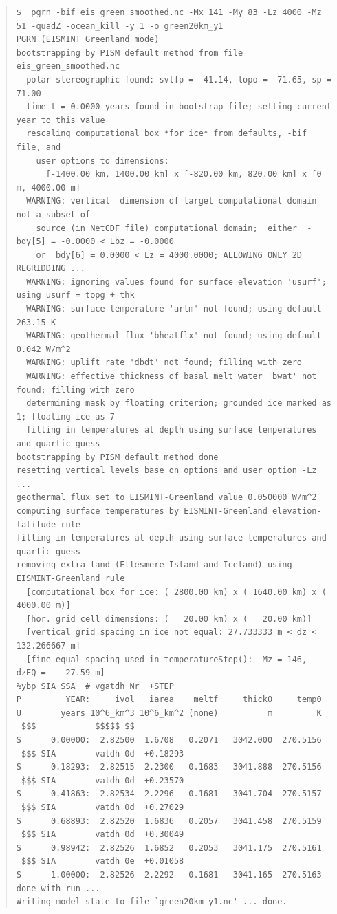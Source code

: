 \documentclass[11pt,final]{amsart}
\begin{document}
\begin{table}\label{bootstrapEISgreen}
\scriptsize
\begin{quote}
\begin{verbatim}
$  pgrn -bif eis_green_smoothed.nc -Mx 141 -My 83 -Lz 4000 -Mz 51 -quadZ -ocean_kill -y 1 -o green20km_y1
PGRN (EISMINT Greenland mode)
bootstrapping by PISM default method from file eis_green_smoothed.nc
  polar stereographic found: svlfp = -41.14, lopo =  71.65, sp =  71.00
  time t = 0.0000 years found in bootstrap file; setting current year to this value
  rescaling computational box *for ice* from defaults, -bif file, and
    user options to dimensions:
      [-1400.00 km, 1400.00 km] x [-820.00 km, 820.00 km] x [0 m, 4000.00 m]
  WARNING: vertical  dimension of target computational domain not a subset of
    source (in NetCDF file) computational domain;  either  -bdy[5] = -0.0000 < Lbz = -0.0000
    or  bdy[6] = 0.0000 < Lz = 4000.0000; ALLOWING ONLY 2D REGRIDDING ...
  WARNING: ignoring values found for surface elevation 'usurf'; using usurf = topg + thk
  WARNING: surface temperature 'artm' not found; using default  263.15 K
  WARNING: geothermal flux 'bheatflx' not found; using default  0.042 W/m^2
  WARNING: uplift rate 'dbdt' not found; filling with zero
  WARNING: effective thickness of basal melt water 'bwat' not found; filling with zero
  determining mask by floating criterion; grounded ice marked as 1; floating ice as 7
  filling in temperatures at depth using surface temperatures and quartic guess
bootstrapping by PISM default method done
resetting vertical levels base on options and user option -Lz ...
geothermal flux set to EISMINT-Greenland value 0.050000 W/m^2
computing surface temperatures by EISMINT-Greenland elevation-latitude rule 
filling in temperatures at depth using surface temperatures and quartic guess
removing extra land (Ellesmere Island and Iceland) using EISMINT-Greenland rule
  [computational box for ice: ( 2800.00 km) x ( 1640.00 km) x ( 4000.00 m)]
  [hor. grid cell dimensions: (   20.00 km) x (   20.00 km)]
  [vertical grid spacing in ice not equal: 27.733333 m < dz < 132.266667 m]
  [fine equal spacing used in temperatureStep():  Mz = 146,  dzEQ =    27.59 m]
%ybp SIA SSA  # vgatdh Nr  +STEP
P         YEAR:     ivol   iarea    meltf     thick0     temp0
U        years 10^6_km^3 10^6_km^2 (none)          m         K
 $$$            $$$$$ $$
S      0.00000:  2.82500  1.6708   0.2071   3042.000  270.5156
 $$$ SIA        vatdh 0d  +0.18293
S      0.18293:  2.82515  2.2300   0.1683   3041.888  270.5156
 $$$ SIA        vatdh 0d  +0.23570
S      0.41863:  2.82534  2.2296   0.1681   3041.704  270.5157
 $$$ SIA        vatdh 0d  +0.27029
S      0.68893:  2.82520  1.6836   0.2057   3041.458  270.5159
 $$$ SIA        vatdh 0d  +0.30049
S      0.98942:  2.82526  1.6852   0.2053   3041.175  270.5161
 $$$ SIA        vatdh 0e  +0.01058
S      1.00000:  2.82526  2.2292   0.1681   3041.165  270.5163
done with run ... 
Writing model state to file `green20km_y1.nc' ... done.
\end{verbatim}
\end{quote}
\normalsize
\bigskip

\caption{Bootstrapping from the EISMINT-Greenland data and running for one model year.}
\end{table}
\end{document}
